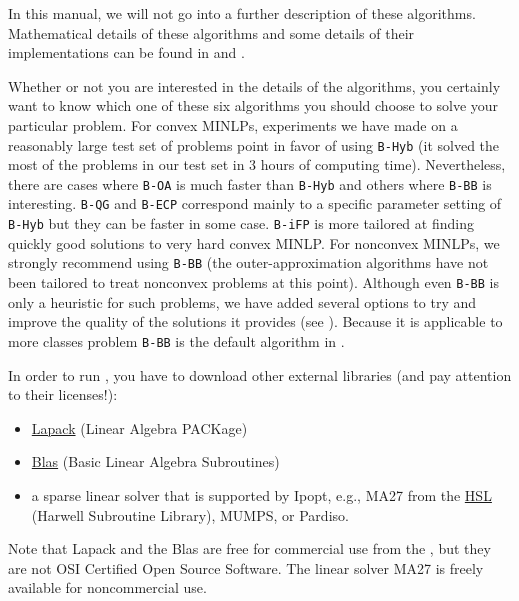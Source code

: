In this manual,  we will not go into a further description of these algorithms.
Mathematical details of these algorithms 
and some details of their implementations can be found in  and .

Whether or not you are interested in the details of the algorithms, you certainly
want to know which one of these six algorithms you should choose to solve
your particular problem.
For convex MINLPs, experiments we have made on a reasonably large test set of problems point in favor of using {\tt B-Hyb}
(it solved the most of the problems in our test set in 3 hours of computing time).
Nevertheless, there are cases where {\tt B-OA} is much faster than {\tt B-Hyb} and others where {\tt B-BB} is interesting.
{\tt B-QG} and {\tt B-ECP} correspond mainly to a specific parameter setting of {\tt B-Hyb} but they can be faster in some case. {\tt B-iFP} is more tailored at finding quickly good solutions to very hard convex MINLP.
For nonconvex MINLPs, we strongly recommend using {\tt B-BB} (the outer-approximation algorithms
have not been tailored to treat nonconvex problems at this point). Although even {\tt B-BB} is only a
heuristic for such problems, we have added several
options to try and improve the quality of the solutions it provides (see ).
Because it is applicable to more classes problem {\tt B-BB} is the default algorithm in \Bonmin.

In order to run {\Bonmin}, you have to download other external
libraries (and pay attention to their licenses!):
\begin{itemize}
\item \href{\LapackAddr}{Lapack} (Linear Algebra
PACKage)
\item \href{\BlasAddr}{Blas} (Basic Linear Algebra
Subroutines)
\item a sparse linear solver that is supported by Ipopt, e.g., MA27 from the
\href{\AslAddr}{HSL}
(Harwell Subroutine Library), MUMPS, or Pardiso.
\end{itemize}

Note that Lapack and the Blas are free for commercial use from the
, but they are
not OSI Certified Open Source Software. The linear solver MA27 is
freely available for noncommercial use.

